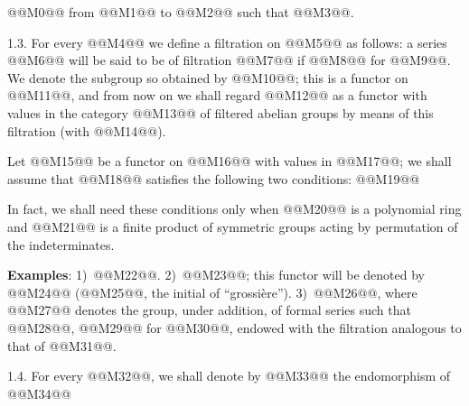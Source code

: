 @@M0@@ from @@M1@@ to @@M2@@ such that @@M3@@.

1.3. For every @@M4@@ we define a filtration on @@M5@@ as follows: a series @@M6@@ will be said to be of filtration @@M7@@ if @@M8@@ for @@M9@@. We denote the subgroup so obtained by @@M10@@; this is a functor on @@M11@@, and from now on we shall regard @@M12@@ as a functor with values in the category @@M13@@ of filtered abelian groups by means of this filtration (with @@M14@@).

Let @@M15@@ be a functor on @@M16@@ with values in @@M17@@; we shall assume that @@M18@@ satisfies the following two conditions:
@@M19@@

In fact, we shall need these conditions only when @@M20@@ is a polynomial ring and @@M21@@ is a finite product of symmetric groups acting by permutation of the indeterminates.

\textbf{Examples}: 1)~@@M22@@. 2)~@@M23@@; this functor will be denoted by @@M24@@ (@@M25@@, the initial of ``grossière''). 3)~@@M26@@, where @@M27@@ denotes the group, under addition, of formal series such that @@M28@@, @@M29@@ for @@M30@@, endowed with the filtration analogous to that of @@M31@@.

1.4. For every @@M32@@, we shall denote by @@M33@@ the endomorphism of @@M34@@
